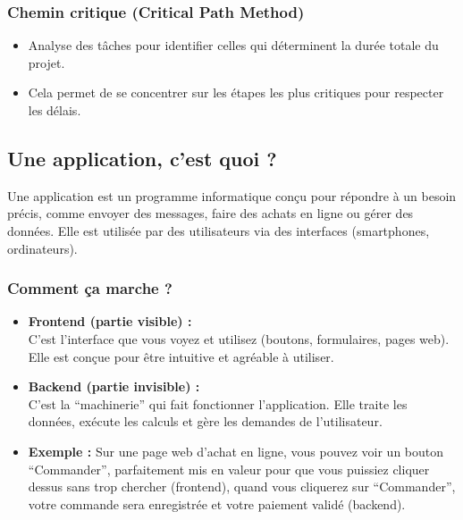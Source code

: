 \documentclass[
  letterpaper,
  DIV=11,
  numbers=noendperiod]{scrartcl}
\providecommand{\tightlist}{%
  \setlength{\itemsep}{0pt}\setlength{\parskip}{0pt}}\usepackage{longtable,booktabs,array}
\begin{document}
\subsubsection{Chemin critique (Critical Path
Method)}\label{chemin-critique-critical-path-method}

\begin{itemize}
\tightlist
\item
  Analyse des tâches pour identifier celles qui déterminent la durée
  totale du projet.
\item
  Cela permet de se concentrer sur les étapes les plus critiques pour
  respecter les délais.
\end{itemize}

\subsection{Une application, c'est quoi
?}\label{une-application-cest-quoi}

Une application est un programme informatique conçu pour répondre à un
besoin précis, comme envoyer des messages, faire des achats en ligne ou
gérer des données. Elle est utilisée par des utilisateurs via des
interfaces (smartphones, ordinateurs).

\subsubsection{Comment ça marche ?}\label{comment-uxe7a-marche}

\begin{itemize}
\item
  \textbf{Frontend (partie visible) :}\\
  C'est l'interface que vous voyez et utilisez (boutons, formulaires,
  pages web). Elle est conçue pour être intuitive et agréable à
  utiliser.
\item
  \textbf{Backend (partie invisible) :}\\
  C'est la ``machinerie'' qui fait fonctionner l'application. Elle
  traite les données, exécute les calculs et gère les demandes de
  l'utilisateur.
\item
  \textbf{Exemple :} Sur une page web d'achat en ligne, vous pouvez voir
  un bouton ``Commander'', parfaitement mis en valeur pour que vous
  puissiez cliquer dessus sans trop chercher (frontend), quand vous
  cliquerez sur ``Commander'', votre commande sera enregistrée et votre
  paiement validé (backend).
\end{itemize}
\end{document}
